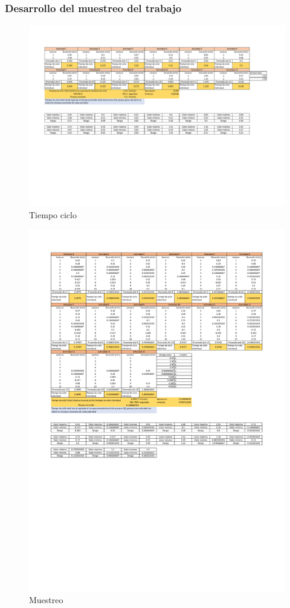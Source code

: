     \subsubsection{Desarrollo del muestreo del trabajo}
    \begin{figure}[H]
        \centering
        \includegraphics[scale=0.25]{13/img/tiempoCicloEnsamble.pdf}
        \caption{Tiempo ciclo}
        \label{fig:Tiempo ciclo}
    \end{figure}
    \begin{figure}[H]
        \centering
        \includegraphics[scale=0.25]{13/img/tiempoCicloDos.pdf}
        \caption{Muestreo}
        \label{fig:Muestreo}
    \end{figure}
